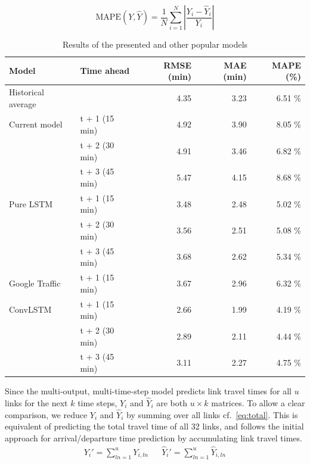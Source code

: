 \documentclass[preprint,11pt,5p,twocolumn]{elsarticle}
\begin{document}
\begin{equation}
    \textrm{MAPE}(Y, \widehat{Y}) = \frac{1}{N} \sum_{i = 1}^{N} \left| \frac{Y_i - \widehat{Y}_i}{Y_i} \right| 
    \label{eq:mape} 
\end{equation}
\vspace{.5em}

\begin{table}[!t]
    \center
    \begin{tabular}{ll|rrr}
        Model & Time ahead & RMSE (min) & MAE (min) & MAPE (\%) \\
        \hline         
        \hline
        Historical average &                & 4.35 & 3.23 & 6.51 \% \\ 
        \hline 
        Current model      & t + 1 (15 min) & 4.92 & 3.90 & 8.05 \% \\
                           & t + 2 (30 min) & 4.91 & 3.46 & 6.82 \% \\
                           & t + 3 (45 min) & 5.47 & 4.15 & 8.68 \% \\
        \hline 
        Pure LSTM          & t + 1 (15 min) & 3.48 & 2.48 & 5.02 \% \\
                           & t + 2 (30 min) & 3.56 & 2.51 & 5.08 \% \\
                           & t + 3 (45 min) & 3.68 & 2.62 & 5.34 \% \\
        \hline 
        Google Traffic     & t + 1 (15 min) & 3.67 & 2.96 & 6.32 \% \\ 
        \hline 
        ConvLSTM           & t + 1 (15 min) & 2.66 & 1.99 & 4.19 \% \\
                           & t + 2 (30 min) & 2.89 & 2.11 & 4.44 \% \\
                           & t + 3 (45 min) & 3.11 & 2.27 & 4.75 \% \\
        \hline 
    \end{tabular}
    \caption{Results of the presented and other popular models}
    \label{tab:results}
\end{table}

Since the multi-output, multi-time-step model predicts link travel times for all $u$ links for the next $k$ time steps, $Y_i$ and $\widehat{Y}_i$ are both $u \times k $ matrices. To allow a clear comparison, we reduce $Y_i$ and $\widehat{Y}_i$ by summing over all links cf.~\cref{eq:total}. This is equivalent of predicting the total travel time of all 32 links, and follows the initial approach for arrival/departure time prediction by accumulating link travel times.
\begin{align}
    Y_i' = \sum_{\mathit{ln} = 1}^{u} Y_{i,\mathit{ln}} & & \widehat{Y}_i' = \sum_{\mathit{ln} = 1}^{u} \widehat{Y}_{i,\mathit{ln}}
    \label{eq:total} 
\end{align}
\end{document}
